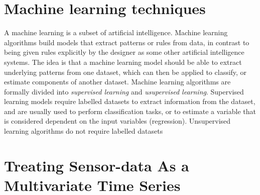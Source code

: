 \section{Machine learning techniques}
A machine learning is a subset of artificial intelligence. Machine learning algorithms build models that extract patterns or rules from data, in contrast to being given rules explicitly by the designer as some other artificial intelligence systems. The idea is that a machine learning model should be able to extract underlying patterns from one dataset, which can then be applied to classify, or estimate components of another dataset. Machine learning algorithms are formally divided into \textit{supervised learning} and \textit{usupervised learning}. Supervised learning models require labelled datasets to extract information from the dataset, and are usually used to perform classification tasks, or to estimate a variable that is considered dependent on the input variables (regression). Unsupervised learning algorithms do not require labelled datasets 

\section{Treating Sensor-data As a Multivariate Time Series}
